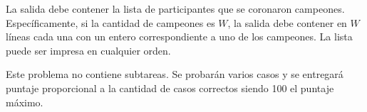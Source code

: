 \documentclass{oci}
\begin{document}
\begin{outputDescription}
  La salida debe contener la lista de participantes que se coronaron campeones.
  Específicamente, si la cantidad de campeones es $W$, la salida debe contener
  en $W$ líneas cada una con un entero correspondiente a uno de los campeones.
  La lista puede ser impresa en cualquier orden.
\end{outputDescription}

\begin{scoreDescription}
  Este problema no contiene subtareas.
  Se probarán varios casos y se entregará puntaje proporcional a la cantidad de casos correctos
  siendo 100 el puntaje máximo.
\end{scoreDescription}

\begin{sampleDescription}
\end{sampleDescription}
\end{document}
